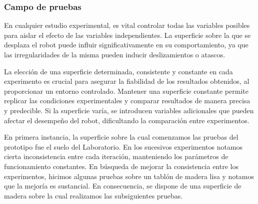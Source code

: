 \subsubsection{Campo de pruebas}

En cualquier estudio experimental, es vital controlar todas las variables posibles para aislar el efecto de las variables independientes. La superficie sobre la que se desplaza el robot puede influir significativamente en su comportamiento, ya que las irregularidades de la misma pueden inducir deslizamientos o atascos.

La elección de una superficie determinada, consistente y constante en cada experimento es crucial para asegurar la fiabilidad de los resultados obtenidos, al proporcionar un entorno controlado. Mantener una superficie constante permite replicar las condiciones experimentales y comparar resultados de manera precisa y predecible. Si la superficie varía, se introducen variables adicionales que pueden afectar el desempeño del robot, dificultando la comparación entre experimentos.

En primera instancia, la superficie sobre la cual comenzamos las pruebas del prototipo fue el suelo del Laboratorio. En los sucesivos experimentos notamos cierta inconsistencia entre cada iteración, manteniendo los parámetros de funcionamiento constantes. En búsqueda de mejorar la consistencia entre los experimentos, hicimos algunas pruebas sobre un tablón de madera lisa y notamos que la mejoría es sustancial. En consecuencia, se dispone de una superficie de madera sobre la cual realizamos las subsiguientes pruebas.
